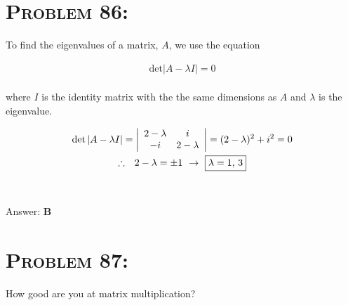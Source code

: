 \documentclass{article}
\begin{document}

\section{\textsc{Problem 86:}} To find the eigenvalues of a matrix, $A$, we use the equation

\begin{gather}
\text{det}\left|  A - \lambda I  \right| = 0
\end{gather}
\\
where $I$ is the identity matrix with the the same dimensions as $A$ and $\lambda$ is the eigenvalue.

\begin{gather}
\text{det}\left|  A - \lambda I \right| =
\left| \begin{array}{cc}
2 - \lambda & i \\
-i & 2 - \lambda \\
\end{array} \right| = (2  -  \lambda)^{2} + i^{2}  = 0 \nonumber\\
\therefore \hspace{.1in} 2 - \lambda = \pm 1 \hspace{.05in} \rightarrow \hspace{.05in} \boxed{\lambda = 1  \text{, } 3} \nonumber
\end{gather}
\\\\
Answer: \textbf{\textcolor{ProcessBlue}B}\\


\section{\textsc{Problem 87:}} How good are you at matrix multiplication?
\end{document}

